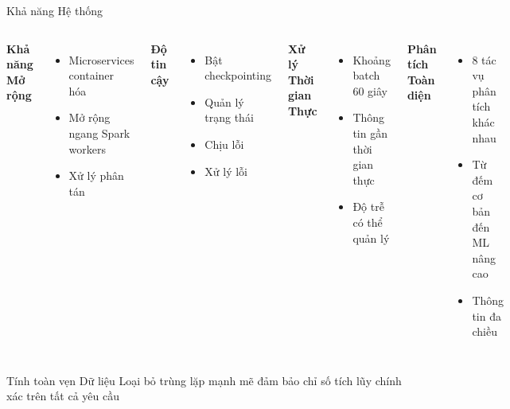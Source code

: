 \documentclass[aspectratio=169]{beamer}
\begin{document}
\begin{frame}{Khả năng Hệ thống}
    \begin{columns}
        \textbf{Khả năng Mở rộng}
        \begin{itemize}
            \item Microservices container hóa
            \item Mở rộng ngang Spark workers
            \item Xử lý phân tán
        \end{itemize}
        
        \vspace{0.3cm}
        \textbf{Độ tin cậy}
        \begin{itemize}
            \item Bật checkpointing
            \item Quản lý trạng thái
            \item Chịu lỗi
            \item Xử lý lỗi
        \end{itemize}
        
        \textbf{Xử lý Thời gian Thực}
        \begin{itemize}
            \item Khoảng batch 60 giây
            \item Thông tin gần thời gian thực
            \item Độ trễ có thể quản lý
        \end{itemize}
        
        \vspace{0.3cm}
        \textbf{Phân tích Toàn diện}
        \begin{itemize}
            \item 8 tác vụ phân tích khác nhau
            \item Từ đếm cơ bản đến ML nâng cao
            \item Thông tin đa chiều
        \end{itemize}
    \end{columns}
    
    \vspace{0.3cm}
    \begin{block}{Tính toàn vẹn Dữ liệu}
        Loại bỏ trùng lặp mạnh mẽ đảm bảo chỉ số tích lũy chính xác trên tất cả yêu cầu
    \end{block}
\end{frame}
\end{document}
